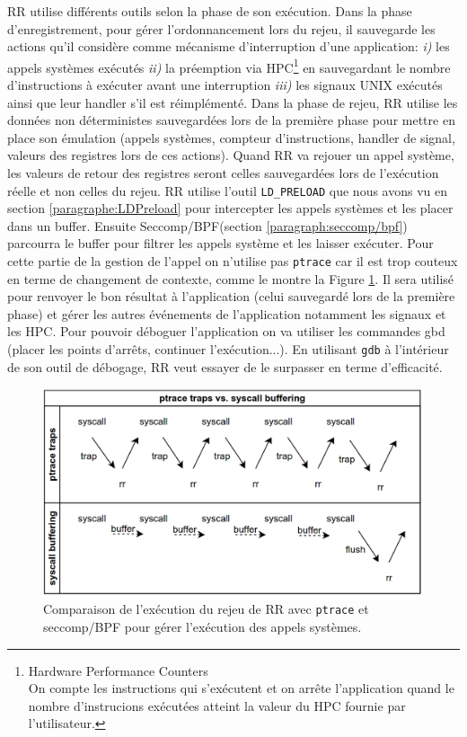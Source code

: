 RR utilise différents outils selon la phase de son
exécution\citep{RRimplem}. Dans la phase d'enregistrement, pour gérer
l'ordonnancement lors du rejeu, il sauvegarde les actions qu'il considère comme
mécanisme d'interruption d'une application: \textit{i)} les appels systèmes
exécutés \textit{ii)} la préemption via HPC\footnote{Hardware Performance
  Counters \\ On compte les instructions qui s'exécutent et on arrête
  l'application quand le nombre d'instrucions exécutées atteint la valeur du HPC
  fournie par l'utilisateur.} en sauvegardant le nombre d'instructions à
exécuter avant une interruption \textit{iii)} les signaux UNIX exécutés ainsi
que leur handler s'il est réimplémenté. Dans la phase de rejeu, RR utilise les
données non déterministes sauvegardées lors de la première phase pour mettre en
place son émulation (appels systèmes, compteur d'instructions, handler de
signal, valeurs des registres lors de ces actions). Quand RR va rejouer un appel
système, les valeurs de retour des registres seront celles sauvegardées lors de
l'exécution réelle et non celles du rejeu. RR utilise l'outil
\texttt{LD\_PRELOAD} que nous avons vu en section \ref{paragraphe:LDPreload}
pour intercepter les appels systèmes et les placer dans un buffer. Ensuite
Seccomp/BPF(section \ref{paragraph:seccomp/bpf}) parcourra le buffer pour
filtrer les appels système et les laisser exécuter. Pour cette partie de la
gestion de l'appel on n'utilise pas \texttt{ptrace} car il est trop couteux en
terme de changement de contexte, comme le montre la Figure \ref{AS_RR}. Il sera utilisé pour renvoyer le bon résultat à l'application (celui sauvegardé
 lors de la première phase) et gérer les autres événements de l'application
 notamment les signaux et les HPC. Pour pouvoir déboguer l'application on va
 utiliser les commandes gbd (placer les points d'arrêts, continuer
 l'exécution...). En utilisant \texttt{gdb} à l'intérieur de son outil de
 débogage, RR veut essayer de le surpasser en terme d'efficacité.

\begin{figure}
\centering \includegraphics[scale=0.30]{Pictures/png/RR_AS}
\caption{Comparaison de l'exécution du rejeu de RR avec \texttt{ptrace} et seccomp/BPF
  pour gérer l'exécution des appels systèmes.}
\label{AS_RR}
\end{figure}

